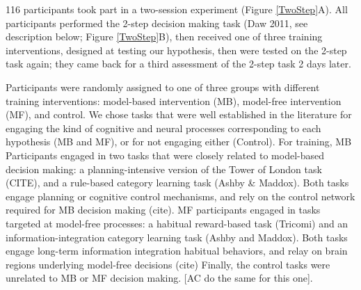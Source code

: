 \documentclass[11pt]{article} %
\begin{document}
116 participants took part in a two-session experiment (Figure \ref{TwoStep}A). All participants performed the 2-step decision making task (Daw 2011, see description below; Figure \ref{TwoStep}B), then received one of three training interventions, designed at testing our hypothesis, then were tested on the 2-step task again; they came back for a third assessment of the 2-step task 2 days later.%

Participants were randomly assigned to one of three groups with different training interventions: model-based intervention (MB), model-free intervention (MF), and control. We chose tasks that were well established in the literature for engaging the kind of cognitive and neural processes corresponding to each hypothesis (MB and MF), or for not engaging either (Control). For training, MB Participants engaged in two tasks that were closely related to model-based decision making: a planning-intensive version of the Tower of London task (CITE), and a rule-based category learning task (Ashby \& Maddox). Both tasks engage planning or cognitive control mechanisms, and rely on the control network required for MB decision making (cite).%
MF participants engaged in tasks targeted at model-free processes: a habitual reward-based task (Tricomi) and an information-integration category learning task (Ashby and Maddox). Both tasks engage long-term information integration habitual behaviors, and relay on brain regions underlying model-free decisions (cite)%
Finally, the control tasks were unrelated to MB or MF decision making. [AC do the same for this one].
\end{document}
